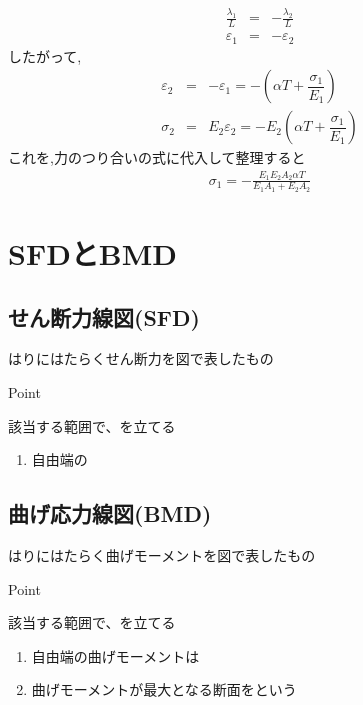 \documentclass[a4paper]{jsarticle}
\begin{document}
\begin{enumerate}[(1)]
          \begin{eqnarray*}
              \frac{\lambda_1}{L}&=&-\frac{\lambda_2}{L}\\
              \varepsilon_1&=&-\varepsilon_2
          \end{eqnarray*}
          したがって,
          \begin{eqnarray*}
              \varepsilon_2&=&-\varepsilon_1=-\left(\alpha T+\dfrac{\sigma_1}{E_1}\right)\\
              \sigma_2&=&E_2\varepsilon_2=-E_2\left(\alpha T+\dfrac{\sigma_1}{E_1}\right)
          \end{eqnarray*}
          これを,力のつり合いの式に代入して整理すると
          \begin{eqnarray*}
              \sigma_1=-\frac{E_1E_2A_2\alpha T}{E_1A_1+E_2A_2}
          \end{eqnarray*}
\end{enumerate}
\section{SFDとBMD}
\subsection{せん断力線図(SFD)}
はりにはたらくせん断力を図で表したもの
\begin{itembox}[l]{Point}
    \begin{center}
        該当する範囲で、を立てる
    \end{center}
\end{itembox}
\begin{enumerate}[(1)]
    \item 自由端の
\end{enumerate}
\subsection{曲げ応力線図(BMD)}
はりにはたらく曲げモーメントを図で表したもの
\begin{itembox}[l]{Point}
    \begin{center}
        該当する範囲で、を立てる
    \end{center}
\end{itembox}
\begin{enumerate}[(1)]
    \item 自由端の曲げモーメントは
    \item 曲げモーメントが最大となる断面をという
\end{enumerate}
\end{document}
